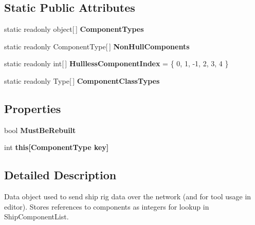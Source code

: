 \subsection*{Static Public Attributes}
\begin{DoxyCompactItemize}
\item 
static readonly object\mbox{[}$\,$\mbox{]} {\bfseries Component\-Types}
\item 
static readonly Component\-Type\mbox{[}$\,$\mbox{]} {\bfseries Non\-Hull\-Components}
\item 
\hypertarget{class_ship_data_a86aa2a6240f6c742448db2ce4cf7defe}{static readonly int\mbox{[}$\,$\mbox{]} {\bfseries Hullless\-Component\-Index} = \{ 0, 1, -\/1, 2, 3, 4 \}}\label{class_ship_data_a86aa2a6240f6c742448db2ce4cf7defe}

\item 
static readonly Type\mbox{[}$\,$\mbox{]} {\bfseries Component\-Class\-Types}
\end{DoxyCompactItemize}
\subsection*{Properties}
\begin{DoxyCompactItemize}
\item 
\hypertarget{class_ship_data_aac11d1d3a4544a1179546eb8c8bb9988}{bool {\bfseries Must\-Be\-Rebuilt}}\label{class_ship_data_aac11d1d3a4544a1179546eb8c8bb9988}

\item 
\hypertarget{class_ship_data_aca9ad1e98ef2ae074cd214d869a64de7}{int {\bfseries this\mbox{[}\-Component\-Type key\mbox{]}}}\label{class_ship_data_aca9ad1e98ef2ae074cd214d869a64de7}

\end{DoxyCompactItemize}


\subsection{Detailed Description}
Data object used to send ship rig data over the network (and for tool usage in editor). Stores references to components as integers for lookup in Ship\-Component\-List. 



